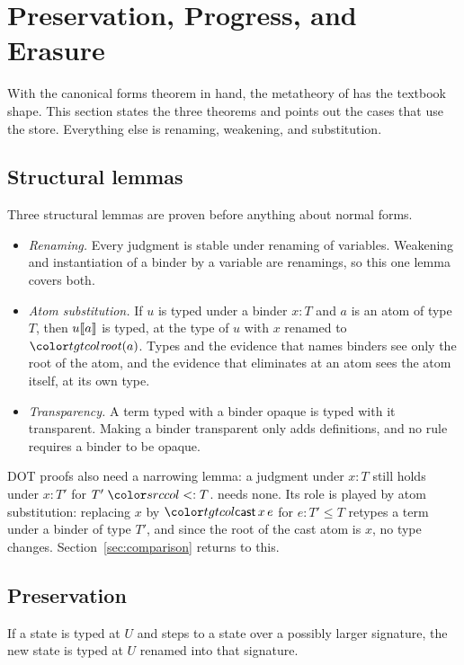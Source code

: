 \mathtgt
\section{Preservation, Progress, and Erasure}\label{sec:metatheory}

With the canonical forms theorem in hand, the metatheory of \FCdot has the textbook shape. This section states the three theorems and points out the cases that use the store. Everything else is renaming, weakening, and substitution.

\subsection{Structural lemmas}

Three structural lemmas are proven before anything about normal forms.
\begin{itemize}
\item \emph{Renaming.} Every judgment is stable under renaming of variables. Weakening and instantiation of a binder by a variable are renamings, so this one lemma covers both.
\item \emph{Atom substitution.} If $u$ is typed under a binder $x : T$ and $a$ is an atom of type $T$, then $u\llbracket a\rrbracket$ is typed, at the type of $u$ with $x$ renamed to $\rt{a}$. Types and the evidence that names binders see only the root of the atom, and the evidence that eliminates at an atom sees the atom itself, at its own type.
\item \emph{Transparency.} A term typed with a binder opaque is typed with it transparent. Making a binder transparent only adds definitions, and no rule requires a binder to be opaque.
\end{itemize}
DOT proofs also need a narrowing lemma: a judgment under $x : T$ still holds under $x : T'$ for $T' \sub T$. \FCdot needs none. Its role is played by atom substitution: replacing $x$ by $\ev{cast}\,x\,e$ for $e : T' \le T$ retypes a term under a binder of type $T'$, and since the root of the cast atom is $x$, no type changes. Section~\ref{sec:comparison} returns to this.

\subsection{Preservation}

\begin{theorem}[Preservation]
If a state is typed at $U$ and steps to a state over a possibly larger signature, the new state is typed at $U$ renamed into that signature.
\end{theorem}

